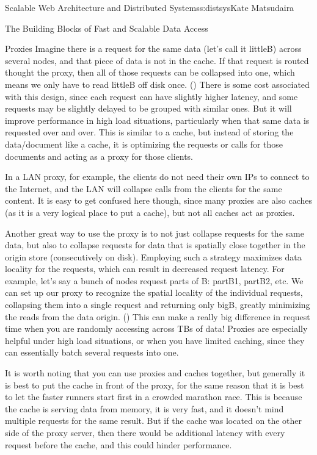 \begin{aosachapter}{Scalable Web Architecture and Distributed Systems}{s:distsys}{Kate Matsudaira}
\begin{aosasect1}{The Building Blocks of Fast and Scalable Data Access}
\begin{aosasect2}{Proxies}
Imagine there is a request for the same data (let's call it littleB)
across several nodes, and that piece of data is not in the cache. If
that request is routed thought the proxy, then all of those requests
can be collapsed into one, which means we only have to read littleB
off disk once. () There is some cost associated with this design, since
each request can have slightly higher latency, and some requests may
be slightly delayed to be grouped with similar ones. But it will
improve performance in high load situations, particularly when that
same data is requested over and over. This is similar to a cache, but
instead of storing the data/document like a cache, it is optimizing
the requests or calls for those documents and acting as a proxy for
those clients. 

In a LAN proxy, for example, the clients do not need
their own IPs to connect to the Internet, and the LAN will collapse
calls from the clients for the same content. It is easy to get
confused here though, since many proxies are also caches (as it is a
very logical place to put a cache), but not all caches act as proxies.


Another great way to use the proxy is to not just collapse requests
for the same data, but also to collapse requests for data that is
spatially close together in the origin store (consecutively on disk).
Employing such a strategy maximizes data locality for the requests,
which can result in decreased request latency. For example, let's say
a bunch of nodes request parts of B: partB1, partB2, etc. We can
set up our proxy to recognize the spatial locality of the individual
requests, collapsing them into a single request and returning only
bigB, greatly minimizing the reads from the data origin. () This can make
a really big difference in request time when you are randomly
accessing across TBs of data! Proxies are especially helpful under
high load situations, or when you have limited caching, since they
can essentially batch several requests into one.


It is worth noting that you can use proxies and caches together, but
generally it is best to put the cache in front of the proxy,
for the same reason that it is best to let the faster runners start first in a
crowded marathon race. This is because the cache is serving data from
memory, it is very fast, and it doesn't mind multiple requests for the
same result. But if the cache was located on the other side of the
proxy server, then there would be additional latency with every
request before the cache, and this could hinder performance.


\end{aosasect2}
\end{aosasect1}
\end{aosachapter}
